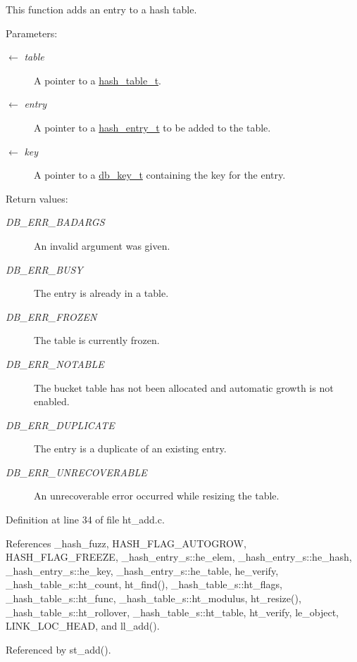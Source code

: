This function adds an entry to a hash table.

\begin{Desc}
\item[Parameters:]
\begin{description}
\item[\mbox{$\leftarrow$} {\em table}]A pointer to a \hyperlink{group__dbprim__hash_ga1}{hash\_\-table\_\-t}. \item[\mbox{$\leftarrow$} {\em entry}]A pointer to a \hyperlink{group__dbprim__hash_ga2}{hash\_\-entry\_\-t} to be added to the table. \item[\mbox{$\leftarrow$} {\em key}]A pointer to a \hyperlink{group__dbprim_ga0}{db\_\-key\_\-t} containing the key for the entry.\end{description}
\end{Desc}
\begin{Desc}
\item[Return values:]
\begin{description}
\item[{\em DB\_\-ERR\_\-BADARGS}]An invalid argument was given. \item[{\em DB\_\-ERR\_\-BUSY}]The entry is already in a table. \item[{\em DB\_\-ERR\_\-FROZEN}]The table is currently frozen. \item[{\em DB\_\-ERR\_\-NOTABLE}]The bucket table has not been allocated and automatic growth is not enabled. \item[{\em DB\_\-ERR\_\-DUPLICATE}]The entry is a duplicate of an existing entry. \item[{\em DB\_\-ERR\_\-UNRECOVERABLE}]An unrecoverable error occurred while resizing the table.\end{description}
\end{Desc}


Definition at line 34 of file ht\_\-add.c.

References \_\-hash\_\-fuzz, HASH\_\-FLAG\_\-AUTOGROW, HASH\_\-FLAG\_\-FREEZE, \_\-hash\_\-entry\_\-s::he\_\-elem, \_\-hash\_\-entry\_\-s::he\_\-hash, \_\-hash\_\-entry\_\-s::he\_\-key, \_\-hash\_\-entry\_\-s::he\_\-table, he\_\-verify, \_\-hash\_\-table\_\-s::ht\_\-count, ht\_\-find(), \_\-hash\_\-table\_\-s::ht\_\-flags, \_\-hash\_\-table\_\-s::ht\_\-func, \_\-hash\_\-table\_\-s::ht\_\-modulus, ht\_\-resize(), \_\-hash\_\-table\_\-s::ht\_\-rollover, \_\-hash\_\-table\_\-s::ht\_\-table, ht\_\-verify, le\_\-object, LINK\_\-LOC\_\-HEAD, and ll\_\-add().

Referenced by st\_\-add().

